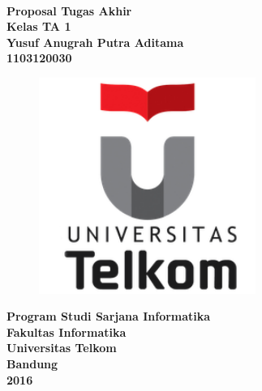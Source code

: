\documentclass[../Book, Implementasi Algoritma Merging Context Seeds untuk Plagiarism Detection.tex]{subfiles}
\begin{document}
\begin{titlepage}
	\begin{center}
		\fontsize{16}{1}\textbf{\judulta{}}\\[1.5cm]
		\fontsize{12}{1}
		\textbf{Proposal Tugas Akhir \\[1cm] Kelas TA 1}\\[1.5cm]
		\textbf{Yusuf Anugrah Putra Aditama \\ 1103120030}\\[2cm]
		\begin{figure}[h!]
			\centering
			\includegraphics[width=200pt]{../images/telu}\\[2cm]
		\end{figure}
		\fontsize{16}{1}\textbf{Program Studi Sarjana Informatika} \\
		\fontsize{16}{1}\textbf{Fakultas Informatika}\\
		\fontsize{16}{1}\textbf{Universitas Telkom}\\
		\fontsize{16}{1}\textbf{Bandung}\\
		\fontsize{16}{1}\textbf{2016}
	\end{center}
\end{titlepage}
\end{document}
